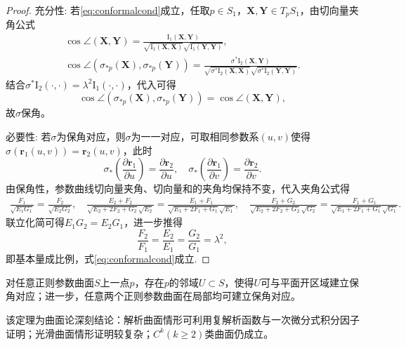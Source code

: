 \documentclass[../../main.tex]{subfiles}%
\begin{document}
\begin{proof}

{\heiti 充分性}:
若\eqref{eq:conformalcond}成立，任取$p\in S_1$，$\bm X,\bm Y\in T_pS_1$，由切向量夹角公式
\begin{align}
\cos\angle(\bm X,\bm Y)=\frac{\mathrm{I}_1(\bm X,\bm Y)}{\sqrt{\mathrm{I}_1(\bm X,\bm X)}\sqrt{\mathrm{I}_1(\bm Y,\bm Y)}},\label{eq:anglecos1}\\
\cos\angle(\sigma_{*p}(\bm X),\sigma_{*p}(\bm Y))=\frac{\sigma^*\mathrm{I}_2(\bm X,\bm Y)}{\sqrt{\sigma^*\mathrm{I}_2(\bm X,\bm X)}\sqrt{\sigma^*\mathrm{I}_2(\bm Y,\bm Y)}}.\label{eq:anglecos2}
\end{align}
结合$\sigma^*\mathrm{I}_2(\cdot,\cdot)=\lambda^2\mathrm{I}_1(\cdot,\cdot)$，代入可得
$$\cos\angle(\sigma_{*p}(\bm X),\sigma_{*p}(\bm Y))=\cos\angle(\bm X,\bm Y),$$
故$\sigma$保角。

{\heiti 必要性}:
若$\sigma$为保角对应，则$\sigma$为一一对应，可取相同参数系$(u,v)$使得$\sigma(\bm r_1(u,v))=\bm r_2(u,v)$，此时
$$\sigma_*\left(\frac{\partial\bm r_1}{\partial u}\right)=\frac{\partial\bm r_2}{\partial u},\quad \sigma_*\left(\frac{\partial\bm r_1}{\partial v}\right)=\frac{\partial\bm r_2}{\partial v}.$$
由保角性，参数曲线切向量夹角、切向量和的夹角均保持不变，代入夹角公式得
\begin{align*}
\frac{F_1}{\sqrt{E_1G_1}}=\frac{F_2}{\sqrt{E_2G_2}},\quad
\frac{E_2+F_2}{\sqrt{E_2+2F_2+G_2}\sqrt{E_2}}=\frac{E_1+F_1}{\sqrt{E_1+2F_1+G_1}\sqrt{E_1}},\quad
\frac{F_2+G_2}{\sqrt{E_2+2F_2+G_2}\sqrt{G_2}}=\frac{F_1+G_1}{\sqrt{E_1+2F_1+G_1}\sqrt{G_1}}.
\end{align*}
联立化简可得$E_1G_2=E_2G_1$，进一步推得
$$\frac{F_2}{F_1}=\frac{E_2}{E_1}=\frac{G_2}{G_1}=\lambda^2,$$
即基本量成比例，式\eqref{eq:conformalcond}成立.
\end{proof}

\begin{theorem}
对任意正则参数曲面$S$上一点$p$，存在$p$的邻域$U\subset S$，使得$U$可与平面开区域建立保角对应；进一步，任意两个正则参数曲面在局部均可建立保角对应。
\end{theorem}

\begin{remark}
该定理为曲面论深刻结论：解析曲面情形可利用复解析函数与一次微分式积分因子证明；光滑曲面情形证明较复杂；$C^k(k\geqslant2)$类曲面仍成立。
\end{remark}
\end{document}
